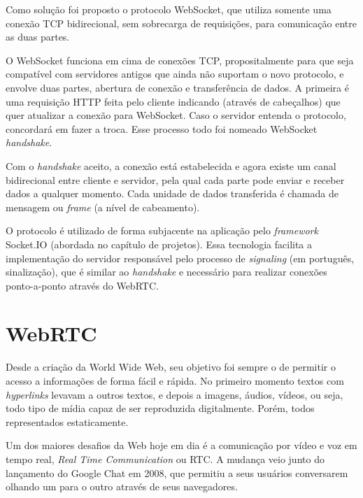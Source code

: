 Como solução foi proposto o protocolo WebSocket, que utiliza somente uma conexão TCP bidirecional, sem sobrecarga de requisições, para comunicação entre as duas partes.

O WebSocket funciona em cima de conexões TCP, propositalmente para que seja compatível com servidores antigos que ainda não suportam o novo protocolo, e envolve duas partes, abertura de conexão e transferência de dados.
A primeira é uma requisição HTTP feita pelo cliente indicando (através de cabeçalhos) que quer atualizar a conexão para WebSocket. Caso o servidor entenda o protocolo, concordará em fazer a troca. Esse processo todo foi nomeado WebSocket \textit{handshake}.

Com o \textit{handshake} aceito, a conexão está estabelecida e agora existe um canal bidirecional entre cliente e servidor, pela qual cada parte pode enviar e receber dados a qualquer momento. Cada unidade de dados transferida é chamada de mensagem ou \textit{frame} (a nível de cabeamento).

O protocolo é utilizado de forma subjacente na aplicação pelo \textit{framework} Socket.IO (abordada no capítulo de projetos). Essa tecnologia facilita a implementação do servidor responsável pelo processo de \textit{signaling} (em português, sinalização), que é similar ao \textit{handshake} e necessário para realizar conexões ponto-a-ponto através do WebRTC. 

\section{WebRTC}

Desde a criação da World Wide Web, seu objetivo foi sempre o de permitir o acesso a informações de forma fácil e rápida. No primeiro momento textos com \textit{hyperlinks} levavam a outros textos, e depois a imagens, áudios, vídeos, ou seja, todo tipo de mídia capaz de ser reproduzida digitalmente. Porém, todos representados estaticamente.

Um dos maiores desafios da Web hoje em dia é a comunicação por vídeo e voz em tempo real, \textit{Real Time Communication} ou RTC. 
A mudança veio junto do lançamento do Google Chat em 2008, que permitiu a seus usuários conversarem olhando um para o outro através de seus navegadores. 

